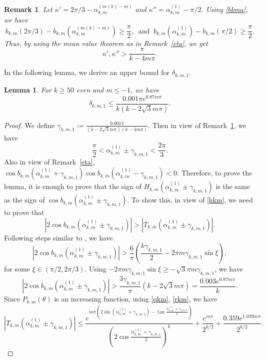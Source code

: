 \documentclass[12pt,reqno]{amsart}
\newtheorem{lem}{Lemma}
\newtheorem{rmk}{Remark}
\newcommand{\rmkref}[1]{Remark~\ref{#1}}
\begin{document}
\begin{rmk}\rm\label{eta'}
Let $\kappa'=2\pi/3-\alpha_{k,m}^{(m(k)-m)}$ and $\kappa{''}=\alpha_{k,m}^{(1)}-\pi/2$. Using \eqref{bkma}, we have
$$
b_{k,m}({2\pi}/{3})-b_{k,m}(\alpha_{k,m}^{(m(k)-m)})\ge\frac{\pi}{2},\  \text{ and }
 \ b_{k,m}(\alpha_{k,m}^{(1)})-b_{k,m}({\pi}/{2})\ge\frac{\pi}{2}.$$ 
Thus, by using the mean value theorem as in \rmkref{eta}, we get
$$
\kappa{'}, \kappa''>\frac{\pi}{k-4m\pi}.
$$
\end{rmk}
In the following lemma, we derive an upper bound for $\delta_{k,m,1}$.
\begin{lem}\label{disp}
For $k\ge 50$ even and $m\le -1$, we have 
$$
\delta_{k,m,1}\le \frac{0.001\pi e^{0.87m\pi}}{k(k-2\sqrt3m\pi)}.
$$
\end{lem}
\begin{proof}
We define $\gamma_{k,m,1}:= \frac{0.001\pi}{(k-2\sqrt3m\pi)(k-4m\pi)}$. Then in view of \rmkref{eta'}, we have
$$
\frac{\pi}{2}<\alpha_{k,m}^{(1)}\pm\gamma_{k,m,1}< \frac{2\pi}{3}.
$$
Also in view of \rmkref{eta}, $\cos b _{k,m}(\alpha_{k,m}^{(1)}+\gamma_{k,m,1})\cos b _{k,m}(\alpha_{k,m}^{(1)}-\gamma_{k,m,1})<0$.
Therefore, to prove the lemma, it is enough to prove that the sign of $H_{k,m}(\alpha_{k,m}^{(1)}\pm\gamma_{k,m,1})$ is the same as the sign of 
$\cos b_{k,m}(\alpha_{k,m}^{(1)}\pm\gamma_{k,m,1})$. To show this, in view of 
\eqref{hkm}, we need to prove that
$$
|2\cos b_{k,m}(\alpha_{k,m}^{(1)}\pm\gamma_{k,m,1})|>|T_{k,m}(\alpha_{k,m}^{(1)}\pm\gamma_{k,m,1})|.
$$
Following steps similar to \cite[\S3]{KS1}, we have 
$$
|2\cos b_{k,m}(\alpha_{k,m}^{(1)}\pm\gamma_{k,m,1})|>\frac{6}{\pi}\left(\frac{k\gamma_{k,m,1}}{2}-2\pi m\gamma_{k,m,1}\sin\xi\right),
$$
for some $\xi\in (\pi/2,2\pi/3)$. Using $-2\pi m\gamma_{k,m,1}\sin\xi\ge -\sqrt 3\pi m\gamma_{k,m,1}$, we have
$$
|2\cos b_{k,m}(\alpha_{k,m}^{(1)}\pm\gamma_{k,m,1})|>\frac{3\gamma_{k,m,1}}{\pi}(k-2\sqrt 3m\pi)=\frac{0.003 e^{0.87m\pi}}{k}.
$$
Since $P_{k,m}(\theta)$ is an increasing function, using \eqref{qkm}, \eqref{rkm}, we have
$$
|T_{k,m}(\alpha_{k,m}^{(1)}\pm\gamma_{k,m,1})|\le \frac{e^{m\pi(2\sin(\alpha_{k,m}^{(1)}+\gamma_{k,m,1})-\tan\frac {\alpha_{k,m}^{(1)}+\gamma_{k,m,1}}{2})}}{(2\cos\frac {\alpha_{k,m}^{(1)}+\gamma_{k,m,1}}{2})^k}+
\frac{e^{m\pi}}{2^{k/2}}+\frac{0.359e^{1.039m\pi}}{2^{k/2}}.
$$
\end{proof}
\end{document}
